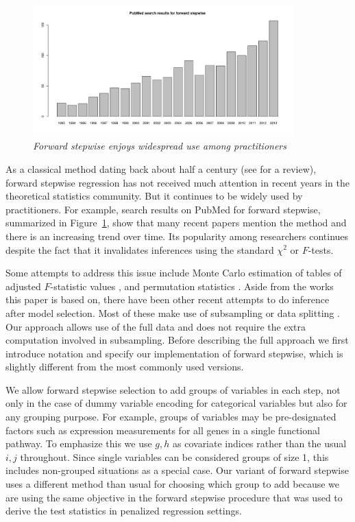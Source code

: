 \documentclass{imsart}
\begin{document}
\begin{figure}
\begin{center}
\includegraphics[width=0.9\textwidth]{../figs/pubmed.pdf}
\caption{\small \it Forward stepwise enjoys widespread use among
practitioners}
\label{fig:pubmed}
\end{center}
\end{figure}


As a classical method dating back about half a century
(see \cite{classical:selection} for a review),
forward stepwise regression has not received much attention in
recent years in the theoretical statistics community. But it continues
to be widely used by practitioners.
For example, search results on PubMed for forward stepwise,
summarized in Figure~\ref{fig:pubmed}, show that many recent
papers mention the method and there is an increasing trend over time.
Its popularity among researchers continues despite the fact that it
invalidates inferences using the standard $\chi^2$ or $F$-tests.


Some attempts to address this issue include Monte Carlo
estimation of tables of adjusted $F$-statistic values \citep{mc:ftoenter},
and permutation statistics \citep{permutation:stop}. Aside from the works
this paper is based on, there have been other recent attempts to do
inference after model selection. Most of these make use of subsampling
\citep{meinshausen:buhlmann} or data splitting \citep{wasserman:roeder}.
Our approach allows use of the full data and does not require the
extra computation involved in subsampling.
Before describing the full approach we first introduce notation and
specify our implementation of forward stepwise, which is slightly
different from the most commonly used versions.


We allow forward stepwise selection to add groups of variables in each
step, not only in the case of dummy variable encoding for categorical
variables but also for any grouping purpose. For example, groups of
variables may be pre-designated factors such as expression
measurements for all genes in a single functional pathway.
To emphasize this we use $g, h$ as covariate indices rather than the usual
$i, j$ throughout. Since single variables can be considered groups of
size 1, this includes non-grouped situations as a special
case. Our variant of forward stepwise uses a different method than
usual for choosing which group to add because we are using the
same objective in the forward stepwise procedure that was used to
derive the test statistics in penalized regression settings.
\end{document}
